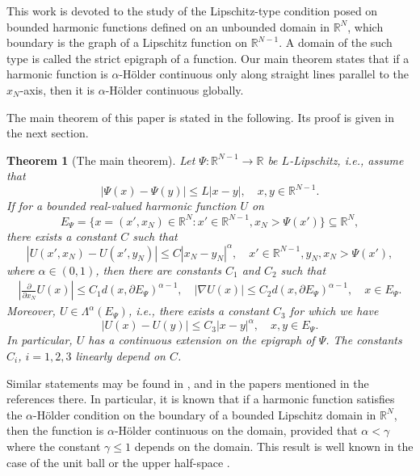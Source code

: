 \documentclass[10pt]{amsart}
\newtheorem{theorem}{Theorem}[section]
\theoremstyle{definition}
\numberwithin{equation}{section}
\begin{document}
This work is devoted to the study of the Lipschitz-type condition posed on bounded harmonic functions defined on      an
unbounded domain in $\mathbb{R}^N$, which boundary is the graph of a Lipschitz function on $\mathbb{R}^{N-1}$.         A
domain of the such type is called  the strict epigraph of a function.       Our main theorem states that if a   harmonic
function is  $\alpha$-H\"{o}lder continuous only along  straight lines parallel  to the $x_N$-axis,           then it is
$\alpha$-H\"{o}lder  continuous   globally.

The main theorem of this paper is stated in the following.     Its proof is given in the next section.

\begin{theorem}[The  main  theorem]\label{TH.MAIN}
Let $\Psi:\mathbb{R}^{N-1}\to\mathbb{R}$ be $L$-Lipschitz, i.e., assume that
\begin{equation*}
|\Psi (x) - \Psi (y) |\le L |x-y|,\quad x,y\in \mathbb {R}^{N-1}.
\end{equation*}
If for  a bounded real-valued harmonic function $U$ on
\begin{equation*}
E_\Psi = \{x = (x',x_N)\in \mathbb{R}^N :x'\in \mathbb{R}^{N-1}, x_N> \Psi (x')\} \subseteq \mathbb{R}^N,
\end{equation*}
there exists a constant $C$ such that
\begin{equation*}
|U(x', x_N)  -  U (x', y_N)| \le   C  |x_N- y_N|^\alpha,\quad  x'\in \mathbb{R}^{N-1}, y_N, x_N>\Psi (x'),
\end{equation*}
where  $\alpha \in (0,1)$, then there  are   constants   $C_1$   and  $C_2$  such that
\begin{equation*}\begin{split}
\left|\frac  {\partial }{\partial x_N} U(x)\right| \le C_1 d(x,\partial E_\Psi)^{\alpha-1},
\quad |\nabla U (x)| \le   C _2  d(x,\partial E_\Psi) ^{\alpha-1} ,\quad x\in E_\Psi.
\end{split}\end{equation*}
Moreover,  $U\in \Lambda^\alpha (E_\Psi)$, i.e., there exists a constant $C_3$ for which we have
\begin{equation*}
|U(x) - U (y)| \le  C_3   |x-y|^{\alpha},\quad x,y\in E_\Psi.
\end{equation*}
In particular, $U$ has a continuous extension on the epigraph of $\Psi$.     The constants    $C_i$, $i=1,2,3$  linearly
depend on $C$.  
\end{theorem}

Similar statements may be found in \cite{AIKAWA.BLMS},              and in the papers mentioned in the references there.
In particular,        it is  known that if a  harmonic  function satisfies   the $\alpha$-H\"{o}lder condition   on  the
boundary of a  bounded Lipschitz domain in $\mathbb{R}^N$, then the function  is  $\alpha$-H\"{o}lder continuous  on the
domain,   provided  that $\alpha<\gamma$ where the  constant  $\gamma \le 1$ depends on the domain.  This result is well
known in the case of the unit ball or the upper half-space \cite{STEIN.BOOK}.
\end{document}
